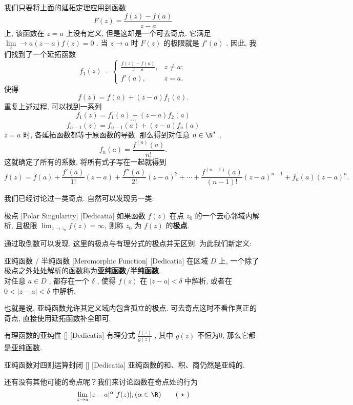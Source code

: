 \documentclass[UTF8]{ctexart}
\newcommand{\MeromorphicFunction}{\hyperref[dfn:MeromorphicFunction]{亚纯函数}}
\begin{document}
\begin{prf}
    我们只要将上面的延拓定理应用到函数
    \[F(z)=\frac{f(z)-f(a)}{z-a}\]
    上, 该函数在 \( z=a \) 上没有定义, 但是这却是一个可去奇点. 它满足 \( \lim\limits_z\to a(z-a)f(z)=0 \) . 当 \( z\to a \) 时 \( F(z) \) 的极限就是 \( f'(a) \) . 因此, 我们找到了一个延拓函数
    \[f_1(z)=\begin{cases}
        \frac{f(z)-f(a)}{z-a}, & z\neq a;\\
        f'(a), &z=a.
    \end{cases}\]
    使得
    \[f(z)=f(a)+(z-a)f_1(a).\]
    重复上述过程, 可以找到一系列
    \[f_1(z)=f_1(a)+(z-a)f_2(a)\]
    \[\cdots\]
    \[f_{n-1}(z)=f_{n-1}(a)+(z-a)f_n(a)\]
     \( z=a \) 时, 各延拓函数都等于原函数的导数. 那么得到对任意 \( n\in\N^* \) ,
    \[f_n(a)=\frac{f^{(n)}(a)}{n!}.\]
    这就确定了所有的系数, 将所有式子写在一起就得到
    \[f(z)=f(a)+\frac{f'(a)}{1!}(z-a)+\frac{f''(a)}{2!}(z-a)^2+\cdots+\frac{f^{(n-1)}(a)}{(n-1)!}(z-a)^{n-1}+f_n(a)(z-a)^n.\]
\end{prf}
我们已经讨论过一类奇点. 自然可以发现另一类: 
\begin{dfn}
    [PolarSingularity]
    {极点}
    [Polar Singularity]
    [Dedicatia]
    如果函数 \( f(z) \) 在点 \( z_0 \) 的一个去心邻域内解析, 且极限 \( \lim_{z \to z_0} f(z) = \infty \), 则称 \( z_0 \) 为 \( f(z) \) 的\textbf{极点}. 
\end{dfn}
通过取倒数可以发现, 这里的极点与有理分式的极点并无区别. 为此我们新定义: 
\begin{dfn}
    [MeromorphicFunction]
    {亚纯函数 / 半纯函数}
    [Meromorphic Function]
    [Dedicatia]
    在区域 \( D \) 上, 一个除了极点之外处处解析的函数称为\textbf{亚纯函数/半纯函数}.\\
    对任意 \( a\in D \) , 都存在一个 \( \delta \) , 使得 \( f(z) \) 在 \( |z-a|<\delta \) 中解析, 或者在 \( 0<|z-a|<\delta \) 中解析. 
\end{dfn}
也就是说, 亚纯函数允许其定义域内包含孤立的极点. 可去奇点这时不看作真正的奇点, 直接使用延拓函数补全即可. 
\begin{crl}
    [UUID]
    {有理函数的亚纯性}
    []
    [Dedicatia]
    有理分式 \( \frac{f(z)}{g(z)} \) , 其中 \( g(z) \) 不恒为0, 那么它都是\MeromorphicFunction.
\end{crl}
\begin{ppt}
    [UUID]
    {亚纯函数对四则运算封闭}
    []
    [Dedicatia]
    亚纯函数的和、积、商仍然是亚纯的. 
\end{ppt}
还有没有其他可能的奇点呢？我们来讨论函数在奇点处的行为
\[\lim_{z\to a}|z-a|^\alpha |f(z)|, (\alpha\in\R)\tag{ \( \star \) }\]
\end{document}
